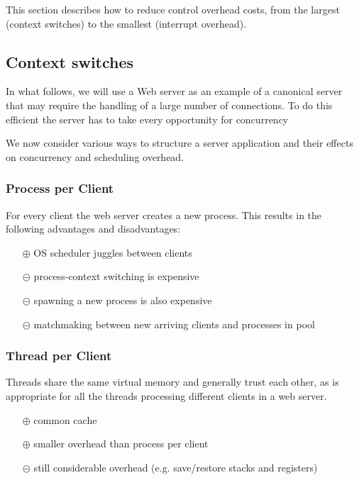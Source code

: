 This section describes how to reduce control overhead costs, from the largest (context switches) to the smallest (interrupt overhead).

\subsection{Context switches}

In what follows, we will use a Web server as an example of a canonical server that may require the handling of a large number of connections. To do this efficient the server has to take every opportunity for concurrency

We now consider various ways to structure a server application and their effects on concurrency and scheduling overhead.

\subsubsection{Process per Client}

For every client the web server creates a new process. This results in the following advantages and disadvantages:

\begin{itemize}
\item[$\oplus$] OS scheduler juggles between clients
\item[$\circleddash$] process-context switching is expensive
\item[$\circleddash$] spawning a new process is also expensive
\item[$\circleddash$] matchmaking between new arriving clients and processes in pool
\end{itemize}


\subsubsection{Thread per Client}

Threads share the same virtual memory and generally trust each other, as is appropriate for all the threads processing different clients in a web server.

\begin{itemize}
\item[$\oplus$] common cache
\item[$\oplus$] smaller overhead than process per client
\item[$\circleddash$] still considerable overhead (e.g. save/restore stacks and registers)
\end{itemize}



